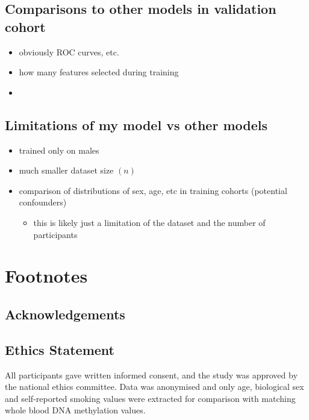 \documentclass{article}
\begin{document}
\subsection*{Comparisons to other models in validation cohort}
\begin{itemize}
    \item obviously ROC curves, etc.
    \item how many features selected during training
    \item
\end{itemize}

\subsection*{Limitations of my model vs other models}
\begin{itemize}
    \item trained only on males
    \item much smaller dataset size \((n)\)
    \item comparison of distributions of sex, age, etc in training cohorts (potential confounders)
          \begin{itemize}
              \item this is likely just a limitation of the dataset and the number of participants
          \end{itemize}
\end{itemize}

\section{Footnotes}

\subsection{Acknowledgements}

\subsection{Ethics Statement}
All participants gave written informed consent, and the study was approved by the national ethics committee. Data was anonymised and only age, biological sex and self-reported smoking values were extracted for comparison with matching whole blood DNA methylation values.

\printbibliography
\end{document}
